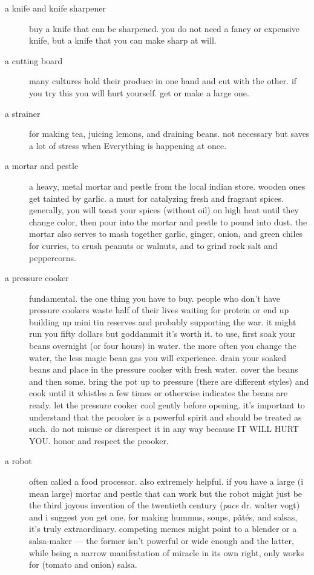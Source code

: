 \begin{description}

  \item[a knife and knife sharpener] buy a knife that can be
  sharpened. you do not need a fancy or expensive knife, but a knife
  that you can make sharp at will.

  \item[a cutting board] many cultures hold their produce in one hand
  and cut with the other. if you try this you will hurt yourself. get
  or make a large one.

  \item[a strainer] for making tea, juicing lemons, and draining
  beans. not necessary but saves a lot of stress when Everything is
  happening at once.

  \item[a mortar and pestle] a heavy, metal mortar and pestle from the
  local indian store. wooden ones get tainted by garlic. a must for
  catalyzing fresh and fragrant spices. generally, you will toast your
  spices (without oil) on high heat until they change color, then pour
  into the mortar and pestle to pound into dust. the mortar also
  serves to mash together garlic, ginger, onion, and green chiles for
  curries, to crush peanuts or walnuts, and to grind rock salt and
  peppercorns.

  \item[a pressure cooker] fundamental. the one thing you have to
  buy. people who don't have pressure cookers waste half of their
  lives waiting for protein or end up building up mini tin reserves
  and probably supporting the war. it might run you fifty dollars but
  goddammit it's worth it. to use, first soak your beans overnight (or
  four hours) in water. the more often you change the water, the less
  magic bean gas you will experience. drain your soaked beans and
  place in the pressure cooker with fresh water. cover the beans and
  then some. bring the pot up to pressure (there are different styles)
  and cook until it whistles a few times or otherwise indicates the
  beans are ready. let the pressure cooker cool gently before
  opening. it's important to understand that the pcooker is a powerful
  spirit and should be treated as such. do not misuse or disrespect it
  in any way because IT WILL HURT YOU. honor and respect the pcooker.

  \item[a robot] often called a food processor. also extremely
  helpful. if you have a large (i mean large) mortar and pestle that
  can work but the robot might just be the third joyous invention of
  the twentieth century (\textit{pace} dr. walter vogt) and i suggest
  you get one. for making hummus, soups, p\^{a}t\'{e}s, and salsas,
  it's truly extraordinary. competing memes might point to a blender
  or a salsa-maker --- the former isn't powerful or wide enough and
  the latter, while being a narrow manifestation of miracle in its own
  right, only works for (tomato and onion) salsa.

\end{description}

